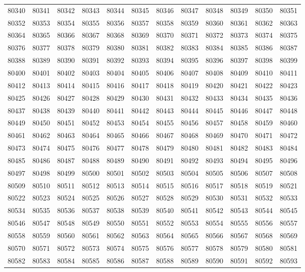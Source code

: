 \begin{center}
\begin{longtable}{llllllllllll}
80340 &80341 &80342 &80343 &80344 &80345 &80346 &80347 &80348 &80349 &80350 &80351 \\
80352 &80353 &80354 &80355 &80356 &80357 &80358 &80359 &80360 &80361 &80362 &80363 \\
80364 &80365 &80366 &80367 &80368 &80369 &80370 &80371 &80372 &80373 &80374 &80375 \\
80376 &80377 &80378 &80379 &80380 &80381 &80382 &80383 &80384 &80385 &80386 &80387 \\
80388 &80389 &80390 &80391 &80392 &80393 &80394 &80395 &80396 &80397 &80398 &80399 \\
80400 &80401 &80402 &80403 &80404 &80405 &80406 &80407 &80408 &80409 &80410 &80411 \\
80412 &80413 &80414 &80415 &80416 &80417 &80418 &80419 &80420 &80421 &80422 &80423 \\
80425 &80426 &80427 &80428 &80429 &80430 &80431 &80432 &80433 &80434 &80435 &80436 \\
80437 &80438 &80439 &80440 &80441 &80442 &80443 &80444 &80445 &80446 &80447 &80448 \\
80449 &80450 &80451 &80452 &80453 &80454 &80455 &80456 &80457 &80458 &80459 &80460 \\
80461 &80462 &80463 &80464 &80465 &80466 &80467 &80468 &80469 &80470 &80471 &80472 \\
80473 &80474 &80475 &80476 &80477 &80478 &80479 &80480 &80481 &80482 &80483 &80484 \\
80485 &80486 &80487 &80488 &80489 &80490 &80491 &80492 &80493 &80494 &80495 &80496 \\
80497 &80498 &80499 &80500 &80501 &80502 &80503 &80504 &80505 &80506 &80507 &80508 \\
80509 &80510 &80511 &80512 &80513 &80514 &80515 &80516 &80517 &80518 &80519 &80521 \\
80522 &80523 &80524 &80525 &80526 &80527 &80528 &80529 &80530 &80531 &80532 &80533 \\
80534 &80535 &80536 &80537 &80538 &80539 &80540 &80541 &80542 &80543 &80544 &80545 \\
80546 &80547 &80548 &80549 &80550 &80551 &80552 &80553 &80554 &80555 &80556 &80557 \\
80558 &80559 &80560 &80561 &80562 &80563 &80564 &80565 &80566 &80567 &80568 &80569 \\
80570 &80571 &80572 &80573 &80574 &80575 &80576 &80577 &80578 &80579 &80580 &80581 \\
80582 &80583 &80584 &80585 &80586 &80587 &80588 &80589 &80590 &80591 &80592 &80593 \\

\end{longtable}
\end{center}
